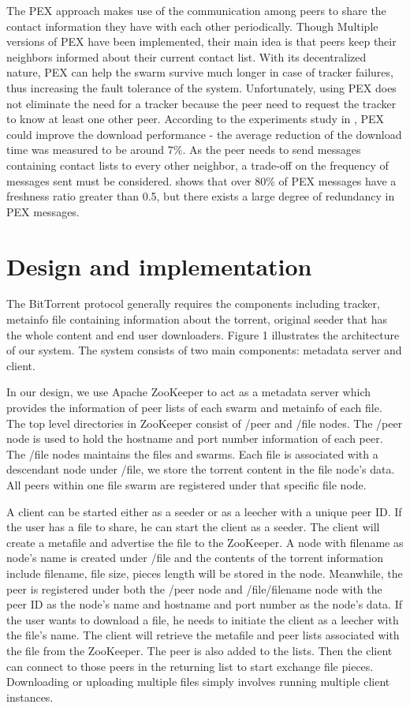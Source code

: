 \documentclass[conference]{IEEEtran}
\begin{document}
The PEX approach makes use of the communication among peers to share the contact information they have with each other periodically. Though Multiple versions of PEX have been implemented, their main idea is that peers keep their neighbors informed about their current contact list. With its decentralized nature, PEX can help the swarm survive much longer in case of tracker failures, thus increasing the fault tolerance of the system. Unfortunately, using PEX does not eliminate the need for a tracker because the peer need to request the tracker to know at least one other peer. According to the experiments study in \cite{PEX}, PEX could improve the download performance - the average reduction of the download time was measured to be around 7\%. As the peer needs to send messages containing contact lists to every other neighbor, a trade-off on the frequency of messages sent must be considered. \cite{PEX} shows that over 80\% of PEX messages have a freshness ratio greater than 0.5, but there exists a large degree of redundancy in PEX messages.




\section{Design and implementation}
The BitTorrent protocol generally requires the components including tracker, metainfo file containing information about the torrent, original seeder that has the whole content and end user downloaders. Figure 1 illustrates the architecture of our system. The system consists of two main components: metadata server and client. 

In our design, we use Apache ZooKeeper to act as a metadata server which provides the information of peer lists of each swarm and metainfo of each file. The top level directories in ZooKeeper consist of /peer and /file nodes. The /peer node is used to hold the hostname and port number information of each peer. The /file nodes maintains the files and swarms.  Each file is associated with a descendant node under /file, we store the  torrent content in the file node’s data. All peers within one file swarm are registered under that specific file node.

A client can be started either as a seeder or as a leecher with a unique peer ID. If the user has a file to share, he can start the client as a seeder. The client will create a metafile and advertise the file to the ZooKeeper. A node with filename as node’s name is created under /file  and the contents of the torrent information include filename, file size,  pieces length will be stored in the node. Meanwhile, the peer is registered under both the /peer node and /file/filename node with the peer ID as the node’s name and hostname and port number as the node’s data. If the user wants to download a file, he needs to initiate the client as a leecher with the file’s name. The client will retrieve the metafile and peer lists associated with the file from the ZooKeeper. The peer is also added to the lists. Then the client can connect to those peers in the returning list to start exchange file pieces. Downloading or uploading multiple files simply involves running multiple client instances.
\end{document}
